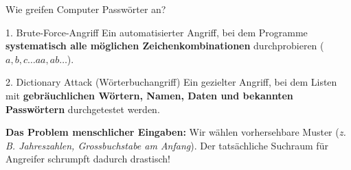 \documentclass[10pt, aspectratio=169]{beamer}
\begin{document}
\begin{frame}{Wie greifen Computer Passwörter an?}
  \pause
  \begin{block}{1. Brute-Force-Angriff}
    Ein automatisierter Angriff, bei dem Programme \textbf{systematisch alle möglichen Zeichenkombinationen} durchprobieren ($a, b, c \dots aa, ab \dots$).
  \end{block}

  \vspace{0.8em}
\pause
  \begin{block}{2. Dictionary Attack (Wörterbuchangriff)}
    Ein gezielter Angriff, bei dem Listen mit \textbf{gebräuchlichen Wörtern, Namen, Daten und bekannten Passwörtern} durchgetestet werden.
  \end{block}
  \pause
  \vspace{0.8em}
  \textbf{Das Problem menschlicher Eingaben:} Wir wählen vorhersehbare Muster (\textit{z. B. Jahreszahlen, Grossbuchstabe am Anfang}). Der tatsächliche Suchraum für Angreifer schrumpft dadurch drastisch!
\end{frame}
\end{document}

